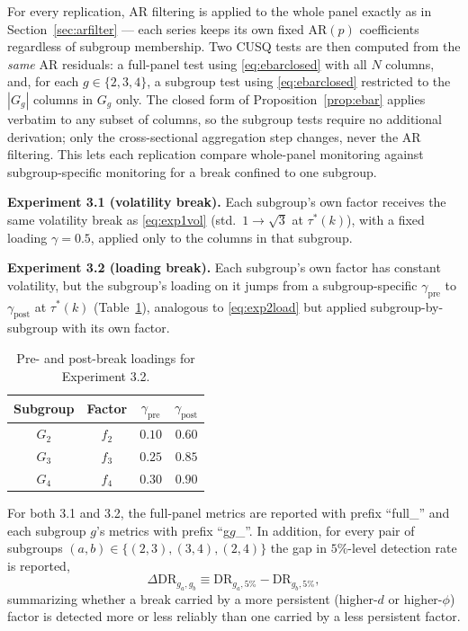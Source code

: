 \documentclass[12pt]{article}
\begin{document}
For every replication, AR filtering is applied to the whole panel exactly
as in Section~\ref{sec:arfilter} --- each series keeps its own fixed AR$(p)$
coefficients regardless of subgroup membership. Two CUSQ tests are then
computed from the \emph{same} AR residuals: a full-panel test using
\eqref{eq:ebarclosed} with all $N$ columns, and, for each $g\in\{2,3,4\}$, a
subgroup test using \eqref{eq:ebarclosed} restricted to the $|G_g|$ columns
in $G_g$ only. The closed form of Proposition~\ref{prop:ebar} applies
verbatim to any subset of columns, so the subgroup tests require no
additional derivation; only the cross-sectional aggregation step changes,
never the AR filtering. This lets each replication compare whole-panel
monitoring against subgroup-specific monitoring for a break confined to one
subgroup.

\textbf{Experiment 3.1 (volatility break).} Each subgroup's own factor
receives the same volatility break as \eqref{eq:exp1vol} (std.\ $1\to\sqrt3$
at $\tau^*(k)$), with a fixed loading $\gamma=0.5$, applied only to the
columns in that subgroup.

\textbf{Experiment 3.2 (loading break).} Each subgroup's own factor has
constant volatility, but the subgroup's loading on it jumps from a
subgroup-specific $\gamma_{\text{pre}}$ to $\gamma_{\text{post}}$ at
$\tau^*(k)$ (Table~\ref{tab:exp32loadings}), analogous to
\eqref{eq:exp2load} but applied subgroup-by-subgroup with its own factor.

\begin{table}[h]
\centering
\caption{Pre- and post-break loadings for Experiment 3.2.}
\label{tab:exp32loadings}
\begin{tabular}{cccc}
\toprule
Subgroup & Factor & $\gamma_{\text{pre}}$ & $\gamma_{\text{post}}$ \\
\midrule
$G_2$ & $f_2$ & $0.10$ & $0.60$ \\
$G_3$ & $f_3$ & $0.25$ & $0.85$ \\
$G_4$ & $f_4$ & $0.30$ & $0.90$ \\
\bottomrule
\end{tabular}
\end{table}

For both 3.1 and 3.2, the full-panel metrics are reported with prefix
``full\_'' and each subgroup $g$'s metrics with prefix ``g$g$\_''. In
addition, for every pair of subgroups $(a,b)\in\{(2,3),(3,4),(2,4)\}$ the
gap in $5\%$-level detection rate is reported,
\begin{equation}
\Delta\mathrm{DR}_{g_a,g_b} \equiv \mathrm{DR}_{g_a,5\%} - \mathrm{DR}_{g_b,5\%},
\label{eq:deltaDR}
\end{equation}
summarizing whether a break carried by a more persistent (higher-$d$ or
higher-$\phi$) factor is detected more or less reliably than one carried by
a less persistent factor.
\end{document}
